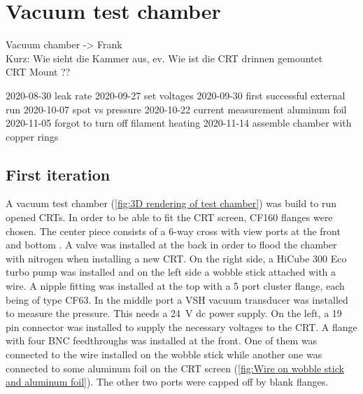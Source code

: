 
\chapter{Vacuum test chamber}
\label{chap:Vacuum chamber}

Vacuum chamber -> Frank \\
Kurz: Wie sieht die Kammer aus, ev. Wie ist die CRT drinnen gemountet \\
CRT Mount ??


2020-08-30 leak rate
2020-09-27 set voltages
2020-09-30 first successful external run
2020-10-07 spot vs pressure
2020-10-22 current measurement aluminum foil
2020-11-05 forgot to turn off filament heating
2020-11-14 assemble chamber with copper rings


\section{First iteration}
\label{sec:vacuum chamber first iteration}

A vacuum test chamber (\cref{fig:3D rendering of test chamber}) was build to run opened CRTs. In order to be able to fit the CRT screen, CF160 flanges were chosen. The center piece consists of a 6-way cross with view ports at the front and bottom . A valve was installed at the back in order to flood the chamber with nitrogen when installing a new CRT. On the right side, a HiCube 300 Eco turbo pump was installed and on the left side a wobble stick attached with a wire. A nipple fitting  was installed at the top with a 5 port cluster flange, each being of type CF63. In the middle port a VSH vacuum transducer was installed to measure the pressure. This needs a \SI{24}{\volt} dc power supply. On the left, a 19 pin connector  was installed to supply the necessary voltages to the CRT. A flange with four BNC feedthroughs was installed at the front. One of them was connected to the wire installed on the wobble stick while another one was connected to some aluminum foil on the CRT screen (\cref{fig:Wire on wobble stick and aluminum foil}). The other two ports were capped off by blank flanges.

